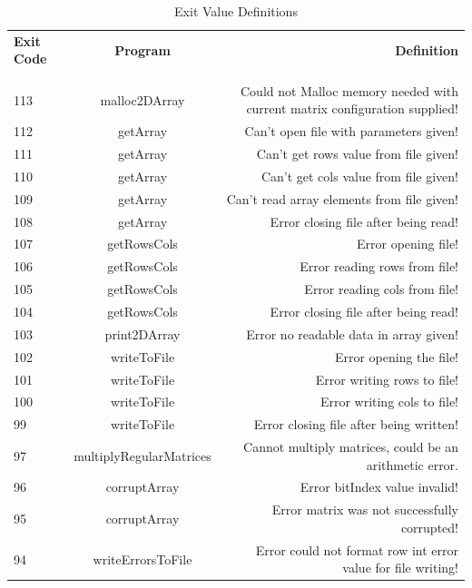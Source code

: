 \documentclass{article}
\begin{document}
    \begin{table}[H]
        \centering
        \caption[Exit Value Definitions]{Exit Value Definitions}
        \label{tab:exitVals}
        \begin{tabulary}{\linewidth}{LCR}
            \\
            \bfseries Exit Code & \bfseries Program & \bfseries Definition
            \\ \\
            \hline
            \\
            113 & malloc2DArray & Could not Malloc memory needed with current matrix configuration supplied! \\
            112 & getArray & Can't open file with parameters given! \\
            111 & getArray & Can't get rows value from file given! \\
            110 & getArray & Can't get cols value from file given! \\
            109 & getArray & Can't read array elements from file given! \\
            108 & getArray & Error closing file after being read! \\
            107 & getRowsCols & Error opening file! \\
            106 & getRowsCols & Error reading rows from file! \\
            105 & getRowsCols & Error reading cols from file! \\
            104 & getRowsCols & Error closing file after being read! \\
            103 & print2DArray & Error no readable data in array given! \\
            102 & writeToFile & Error opening the file! \\
            101 & writeToFile & Error writing rows to file! \\
            100 & writeToFile & Error writing cols to file! \\
            99 & writeToFile & Error closing file after being written! \\
            97 & multiplyRegularMatrices & Cannot multiply matrices, could be an arithmetic error. \\
            96 & corruptArray & Error bitIndex value invalid! \\
            95 & corruptArray & Error matrix was not successfully corrupted! \\
            94 & writeErrorsToFile & Error could not format row int error value for file writing! \\

\end{tabulary}
\end{table}
\end{document}
